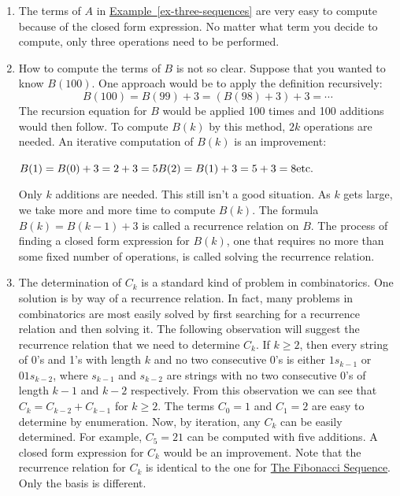 \documentclass[10pt,]{book}
\theoremstyle{plain}
\theoremstyle{definition}
\theoremstyle{definition}
\theoremstyle{definition}
\theoremstyle{definition}
\numberwithin{equation}{section}
\begin{document}
\begin{enumerate}[label=\alph*]
\item\hypertarget{li-21}{} The terms of \(A\) in \hyperref[ex-three-sequences]{Example~\ref{ex-three-sequences}} are very easy to compute because of the closed form expression. No matter what term you decide to
compute, only three operations need to be performed.%
\item\hypertarget{li-22}{} How to compute the terms of \(B\) is not so clear. Suppose that you wanted to know \(B(100)\). One approach would be to apply the definition
recursively: \[B(100) = B(99) + 3 = (B(98) + 3) + 3 =\cdots\]
The recursion equation for \(B\) would be applied 100 times and 100 additions would then follow. To compute \(B(k)\) by this
method, \(2k\) operations are needed. An iterative computation of \(B(k)\) is an improvement: 

\(B(1) =B(0) +3 = 2 + 3 = 5\\
\\
B(2) =B(1)+3= 5 + 3 = 8\\
\\
\text{etc}.\)

Only \(k\) additions are needed. This still isn't a good situation. As \(k\) gets large, we take more and more time to compute \(B(k)\).  The formula \(B(k)=B(k-1)+3\) is called a recurrence relation on \(B\). The process of finding a closed form expression for
\(B(k)\), one that requires no more than some fixed number of operations, is called solving the recurrence relation.
%
\item\hypertarget{li-23}{} The determination of \(C_k\) is a standard kind of problem in combinatorics. One solution is by way of a recurrence relation. In fact, many problems in combinatorics are most easily solved by first searching for a recurrence relation and then solving it. The following
observation will suggest the recurrence relation that we need to determine \(C_k\). If \(k \geq  2\), then every string of 0's and 1's with length
\(k\) and no two consecutive 0's is either \(1s_{k-1}\) or \(01s_{k-2}\), where \(s_{k-1}\) and \(s_{k-2}\) are strings with no two consecutive
0's of length \(k - 1\) and \(k - 2\) respectively. From this observation we can see that \(C_k= C_{k-2}+C_{k-1}\) for \(k\geq 2\). The terms \(C_0=
1\) and \(C_1 = 2\) are easy to determine by enumeration. Now, by iteration, any \(C_k\) can be easily determined. For example, \(C_5 = 21\) can be computed with five additions. A closed form expression for \(C_k\) would be an improvement. Note that the recurrence relation for \(C_k\) is identical to the one for \hyperref[ex-fibonacci-sequence]{The Fibonacci Sequence}. Only the basis is different.%
\end{enumerate}
%
\typeout{************************************************}
\typeout{************************************************}
\end{document}

